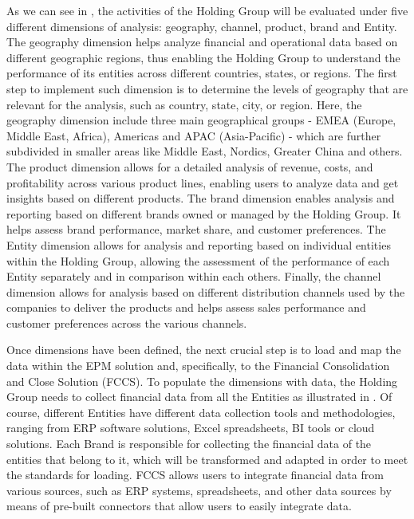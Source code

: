 \documentclass[12pt,a4paper,openright,twoside]{book}
\begin{document}
As we can see in , the activities of the Holding Group will be evaluated under five different dimensions of analysis: geography, channel, product, brand and Entity.
%
The geography dimension helps analyze financial and operational data based on different geographic regions, thus enabling the Holding Group to understand the performance of its entities across different countries, states, or regions. 
%
The first step to implement such dimension is to determine the levels of geography that are relevant for the analysis, such as country, state, city, or region.
%
Here, the geography dimension include three main geographical groups - EMEA (Europe, Middle East, Africa), Americas and APAC (Asia-Pacific) - which are further subdivided in smaller areas like Middle East, Nordics, Greater China and others.
%
The product dimension allows for a detailed analysis of revenue, costs, and profitability across various product lines, enabling users to analyze data and get insights based on different products.
%
The brand dimension enables analysis and reporting based on different brands owned or managed by the Holding Group. It helps assess brand performance, market share, and customer preferences.
%
The Entity dimension allows for analysis and reporting based on individual entities within the Holding Group, allowing the assessment of the performance of each Entity separately and in comparison within each others.
%
Finally, the channel dimension allows for analysis based on different distribution channels used by the companies to deliver the products and helps assess sales performance and customer preferences across the various channels. 

Once dimensions have been defined, the next crucial step is to load and map the data within the EPM solution and, specifically, to the Financial Consolidation and Close Solution (FCCS). 
%
To populate the dimensions with data, the Holding Group needs to collect financial data from all the Entities as illustrated in .
%
Of course, different Entities have different data collection tools and methodologies, ranging from ERP software solutions, Excel spreadsheets, BI tools or cloud solutions.
%
Each Brand is responsible for collecting the financial data of the entities that belong to it, which will be transformed and adapted in order to meet the standards for loading.  
%
FCCS allows users to integrate financial data from various sources, such as ERP systems, spreadsheets, and other data sources by means of pre-built connectors that allow users to easily integrate data.
\end{document}
